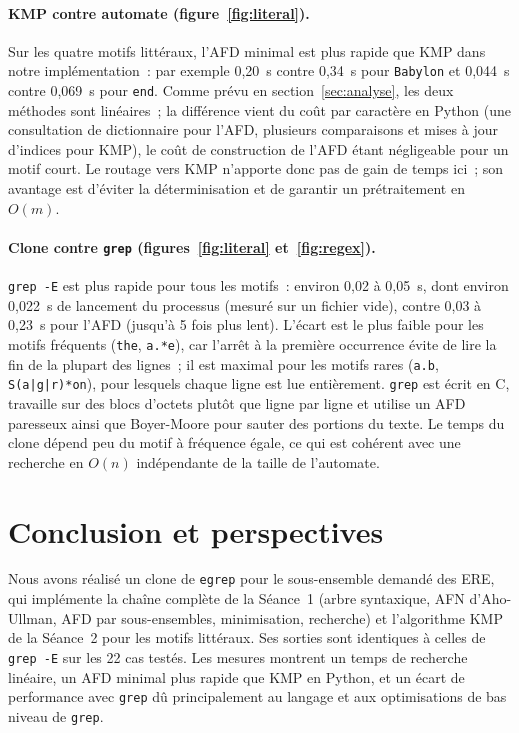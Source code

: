 \documentclass[11pt,a4paper]{article}
\begin{document}
\paragraph{KMP contre automate (figure~\ref{fig:literal}).} Sur les quatre
motifs littéraux, l'AFD minimal est plus rapide que KMP dans notre
implémentation~: par exemple 0,20~s contre 0,34~s pour \texttt{Babylon} et
0,044~s contre 0,069~s pour \texttt{end}. Comme prévu en
section~\ref{sec:analyse}, les deux méthodes sont linéaires~; la différence
vient du coût par caractère en Python (une consultation de dictionnaire pour
l'AFD, plusieurs comparaisons et mises à jour d'indices pour KMP), le coût de
construction de l'AFD étant négligeable pour un motif court. Le routage vers
KMP n'apporte donc pas de gain de temps ici~; son avantage est d'éviter la
déterminisation et de garantir un prétraitement en $O(m)$.

\paragraph{Clone contre \texttt{grep} (figures~\ref{fig:literal} et~\ref{fig:regex}).}
\texttt{grep -E} est plus rapide pour tous les motifs~: environ 0,02 à 0,05~s,
dont environ 0,022~s de lancement du processus (mesuré sur un fichier vide),
contre 0,03 à 0,23~s pour l'AFD (jusqu'à 5 fois plus lent). L'écart est le plus faible pour
les motifs fréquents (\texttt{the}, \texttt{a.*e}), car l'arrêt à la première
occurrence évite de lire la fin de la plupart des lignes~; il est maximal pour
les motifs rares (\texttt{a.b}, \texttt{S(a|g|r)*on}), pour lesquels chaque
ligne est lue entièrement. \texttt{grep} est écrit en C, travaille sur des
blocs d'octets plutôt que ligne par ligne et utilise un AFD paresseux ainsi
que Boyer-Moore pour sauter des portions du texte. Le temps du clone dépend
peu du motif à fréquence égale, ce qui est cohérent avec une recherche en
$O(n)$ indépendante de la taille de l'automate.

\section{Conclusion et perspectives}

Nous avons réalisé un clone de \texttt{egrep} pour le sous-ensemble demandé
des ERE, qui implémente la chaîne complète de la Séance~1 (arbre syntaxique,
AFN d'Aho-Ullman, AFD par sous-ensembles, minimisation, recherche) et
l'algorithme KMP de la Séance~2 pour les motifs littéraux. Ses sorties sont
identiques à celles de \texttt{grep -E} sur les 22 cas testés. Les mesures
montrent un temps de recherche linéaire, un AFD minimal plus rapide que KMP en
Python, et un écart de performance avec \texttt{grep} dû principalement au
langage et aux optimisations de bas niveau de \texttt{grep}.
\end{document}
